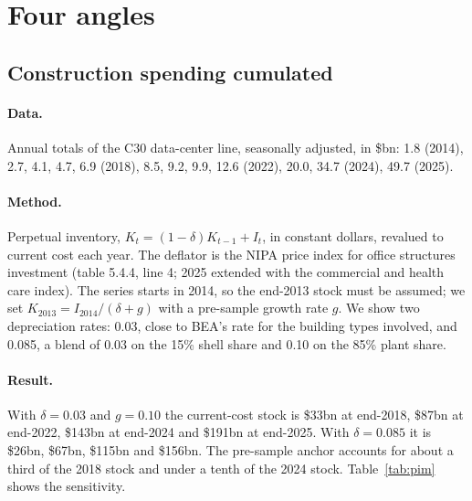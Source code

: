 \documentclass[11pt]{article}
\newcommand{\bn}{\$bn}
\begin{document}
\section{Four angles}
\label{sec:angles}

\subsection{Construction spending cumulated}
\label{sec:c30}

\paragraph{Data.} Annual totals of the C30 data-center line, seasonally adjusted, in \bn: 1.8 (2014), 2.7, 4.1, 4.7, 6.9 (2018), 8.5, 9.2, 9.9, 12.6 (2022), 20.0, 34.7 (2024), 49.7 (2025).

\paragraph{Method.} Perpetual inventory, $K_t=(1-\delta)K_{t-1}+I_t$, in constant dollars, revalued to current cost each year. The deflator is the NIPA price index for office structures investment (table 5.4.4, line 4; 2025 extended with the commercial and health care index). The series starts in 2014, so the end-2013 stock must be assumed; we set $K_{2013}=I_{2014}/(\delta+g)$ with a pre-sample growth rate $g$. We show two depreciation rates: 0.03, close to BEA's rate for the building types involved, and 0.085, a blend of 0.03 on the 15\% shell share and 0.10 on the 85\% plant share.

\paragraph{Result.} With $\delta=0.03$ and $g=0.10$ the current-cost stock is \$33bn at end-2018, \$87bn at end-2022, \$143bn at end-2024 and \$191bn at end-2025. With $\delta=0.085$ it is \$26bn, \$67bn, \$115bn and \$156bn. The pre-sample anchor accounts for about a third of the 2018 stock and under a tenth of the 2024 stock. Table~\ref{tab:pim} shows the sensitivity.
\end{document}
